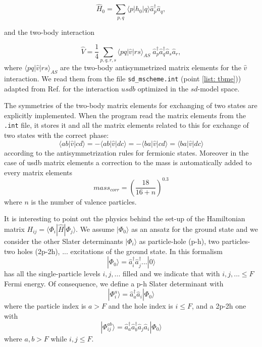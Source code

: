 \documentclass[twoside]{article}
\newcommand{\bra}[1]{\langle #1 |}
\newcommand{\ket}[1]{| #1 \rangle}
\begin{document}
\begin{equation}
\hat H_0 =  \sum_{p,q} \langle p \vert \hat h_0 \vert q \rangle \hat a_{p}^\dagger \hat a_{q},
\end{equation}

and the two-body interaction

\begin{equation}
\hat V = \frac{1}{4} \sum_{p,q,r,s} \langle p q\vert \hat v \vert rs \rangle_{AS} \;\hat a_{p}^\dagger \hat a_{q}^\dagger \hat a_{s} \hat a_{r},
\end{equation}
where $\langle p q\vert \hat v \vert rs \rangle_{AS}$ are the two-body antisymmetrized matrix elements for the $\hat v$ interaction. We read them from the file \texttt{sd\_mscheme.int} (point \ref{list: tbme})) adapted from Ref.\cite{file_link} for the interaction $usdb$ optimized in the $sd$-model space.

The symmetries of the two-body matrix elements for exchanging of two states are explicitly implemented. When the program read the matrix elements from the \texttt{.int} file, it stores it and all the matrix elements related to this for exchange of two states with the correct phase:
\begin{equation}
\bra{ab} \hat v \ket{cd} = -\bra{ab} \hat v \ket{dc}= -\bra{ba} \hat v \ket{cd}= \bra{ba} \hat v \ket{dc}
\end{equation}
according to the antisymmetrization rules for fermionic states. Moreover in the case of usdb matrix elements a correction to the mass is automatically added to every matrix elements
\begin{equation}
mass_{corr} = \left(\frac{18}{16+n} \right)^{0.3}
\end{equation}
where $n$ is the number of valence particles.



It is interesting to point out the physics behind the set-up of the Hamiltonian matrix $H_{ij}=\bra{\Phi_i} \hat H \ket{\Phi_j}$.
We assume $\ket{\Phi_0}$ as an ansatz for the ground state and we consider the other Slater determinants $\ket{\Phi_i}$ as particle-hole (p-h), two particles- two holes (2p-2h), ... excitations of the ground state.
In this formalism 
\begin{equation}
\ket{\Phi_0} = \hat a_{i}^\dagger \hat a_{j}^\dagger... \ket{0}
\end{equation}
has all the single-particle levels $i,j,...$ filled and we indicate that with $i,j,...\leq F$ Fermi energy.
Of consequence, we define a p-h Slater determinant with 
\begin{equation}
\ket{\Phi_i^a} = \hat a_{a}^\dagger \hat a_{i} \ket{\Phi_0}
\end{equation}
where the particle index is $a > F$ and the hole index is $i \leq F$, and a 2p-2h one with 
\begin{equation}
\ket{\Phi_{ij}^{ab}} = \hat a_{a}^\dagger \hat a_{b}^\dagger \hat a_{j} \hat a_{i} \ket{\Phi_0}
\end{equation}
where $a,b > F$ while $i,j \leq F$.
\end{document}
